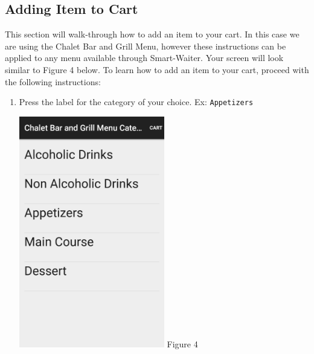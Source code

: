 \documentclass[12pt, titlepage]{article}
\begin{document}
\subsection{Adding Item to Cart}
This section will walk-through how to add an item to your cart. In this case we are using the Chalet Bar and Grill Menu, however these instructions can be applied to any menu available through Smart-Waiter. Your screen will look similar to Figure 4 below. To learn how to add an item to your cart, proceed with the following instructions:
	\begin{enumerate}
		\item Press the label for the category of your choice. Ex: 						\texttt{Appetizers}

	\begin{center}
		\includegraphics[width=0.5\textwidth]{main-menu.png}
		\linebreak Figure 4
	\end{center}


\end{enumerate}
\end{document}
